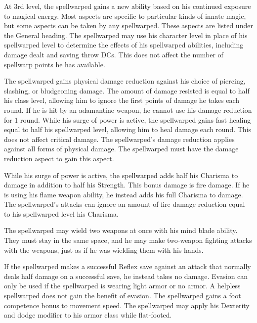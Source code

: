  At 3rd level, the spellwarped gains a new ability based on his continued exposure to magical energy. Most aspects are specific to particular kinds of innate magic, but some aspects can be taken by any spellwarped. These aspects are listed under the General heading.
 The spellwarped may use his character level in place of his spellwarped level to determine the effects of his spellwarped abilities, including damage dealt and saving throw DCs. This does not affect the number of spellwarp points he has available.

 The spellwarped gains physical damage reduction against his choice of piercing, slashing, or bludgeoning damage. The amount of damage resisted is equal to half his class level, allowing him to ignore the first points of damage he takes each round. If he is hit by an adamantine weapon, he cannot use his damage reduction for 1 round.
 While his surge of power is active, the spellwarped gains fast healing equal to half his spellwarped level, allowing him to heal damage each round. This does not affect critical damage.
 The spellwarped's damage reduction applies against all forms of physical damage. The spellwarped must have the damage reduction aspect to gain this aspect.

 While his surge of power is active, the spellwarped adds half his Charisma to damage in addition to half his Strength. This bonus damage is fire damage. If he is using his flame weapon ability, he instead adds his full Charisma to damage.
 The spellwarped's attacks can ignore an amount of fire damage reduction equal to his spellwarped level \add his Charisma.

 The spellwarped may wield two weapons at once with his mind blade ability. They must stay in the same space, and he may make two-weapon fighting attacks with the weapons, just as if he was wielding them with his hands.

 If the spellwarped makes a successful Reflex save against an attack that normally deals half damage on a successful save, he instead takes no damage. Evasion can only be used if the spellwarped is wearing light armor or no armor. A helpless spellwarped does not gain the benefit of evasion.
 The spellwarped gains a  foot competence bonus to movement speed.
 The spellwarped may apply his Dexterity and dodge modifier to his armor class while flat-footed.

